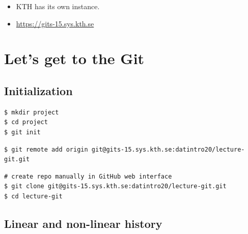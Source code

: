 \begin{frame}
  \begin{remark}
    \begin{itemize}
      \item KTH has its own instance.
      \item \url{https://gits-15.sys.kth.se}
    \end{itemize}
  \end{remark}
\end{frame}


\section{Let's get to the Git}

\subsection{Initialization}

\begin{frame}[fragile]
  \begin{example}[No remote]
    \begin{lstlisting}
$ mkdir project
$ cd project
$ git init
    \end{lstlisting}
  \end{example}

  \pause

  \begin{example}
    \begin{lstlisting}
$ git remote add origin git@gits-15.sys.kth.se:datintro20/lecture-git.git
    \end{lstlisting}
  \end{example}
\end{frame}

\begin{frame}[fragile]
  \begin{example}
    \begin{lstlisting}
# create repo manually in GitHub web interface
$ git clone git@gits-15.sys.kth.se:datintro20/lecture-git.git
$ cd lecture-git
    \end{lstlisting}
  \end{example}
\end{frame}

\subsection{Linear and non-linear history}

